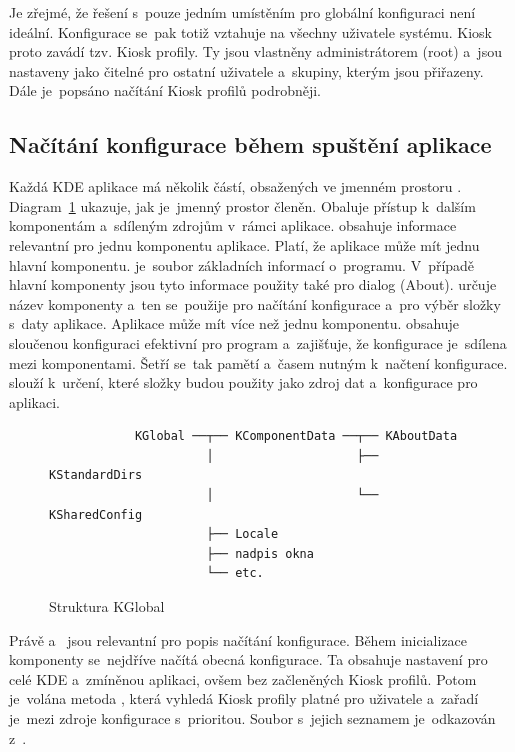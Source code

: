 Je zřejmé, že řešení s~pouze jedním umístěním pro globální konfiguraci není ideální. Konfigurace se~pak totiž vztahuje na všechny uživatele systému. Kiosk proto zavádí tzv. Kiosk profily. Ty jsou vlastněny administrátorem (root) a~jsou nastaveny jako čitelné pro ostatní uživatele a~skupiny, kterým jsou přiřazeny. Dále je~popsáno načítání Kiosk profilů podrobněji.

\subsection*{Načítání konfigurace během spuštění aplikace}
Každá KDE aplikace má několik částí, obsažených ve jmenném prostoru . Diagram~\ref{fig:kglobal} ukazuje, jak je~jmenný prostor  členěn. Obaluje přístup k~dalším komponentám a~sdíleným zdrojům v~rámci aplikace.  obsahuje informace relevantní pro jednu komponentu aplikace. Platí, že aplikace může mít jednu hlavní komponentu.  je~soubor základních informací o~programu. V~případě hlavní komponenty jsou tyto informace použity také pro dialog  (About).  určuje název komponenty a~ten se~použije pro načítání konfigurace a~pro výběr složky s~daty aplikace. Aplikace může mít více než jednu komponentu.  obsahuje sloučenou konfiguraci efektivní pro program a~zajišťuje, že konfigurace je~sdílena mezi komponentami. Šetří se~tak pamětí a~časem nutným k~načtení konfigurace.  slouží k~určení, které složky budou použity jako zdroj dat a~konfigurace pro aplikaci.

\begin{figure}[h]
    \centering
    \begin{verbatim}
            KGlobal ──┬── KComponentData ──┬── KAboutData
                      │                    ├── KStandardDirs
                      │                    └── KSharedConfig
                      ├── Locale
                      ├── nadpis okna
                      └── etc.\end{verbatim}
    \caption{Struktura KGlobal}
    \label{fig:kglobal}
\end{figure}

Právě  a~ jsou relevantní pro popis načítání konfigurace. Během inicializace komponenty se~nejdříve načítá obecná konfigurace. Ta obsahuje nastavení pro celé KDE a~zmíněnou aplikaci, ovšem bez začleněných Kiosk profilů. Potom je~volána metoda , která vyhledá Kiosk profily platné pro uživatele a~zařadí je~mezi zdroje konfigurace s~prioritou. Soubor s~jejich seznamem je~odkazován z~.

